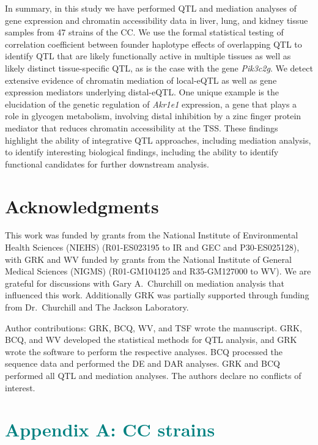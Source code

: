 \documentclass[9pt,twocolumn,twoside]{gsajnl}
\newcommand{\GKinline}[1]{\textcolor{teal}{#1}}
\begin{document}
In summary, in this study we have performed QTL and mediation analyses of gene expression and chromatin accessibility data in liver, lung, and kidney tissue samples from 47 strains of the CC. We use the formal statistical testing of correlation coefficient between founder haplotype effects of overlapping QTL to identify QTL that are likely functionally active in multiple tissues as well as likely distinct tissue-specific QTL, as is the case with the gene \textit{Pik3c2g}. We detect extensive evidence of chromatin mediation of local-eQTL as well as gene expression mediators underlying distal-eQTL. One unique example is the elucidation of the genetic regulation of \textit{Akr1e1} expression, a gene that plays a role in glycogen metabolism, involving distal inhibition by a zinc finger protein mediator that reduces chromatin accessibility at the TSS. These findings highlight the ability of integrative QTL approaches, including mediation analysis, to identify interesting biological findings, including the ability to identify functional candidates for further downstream analysis.

\section{Acknowledgments}
This work was funded by grants from the National Institute of Environmental Health Sciences (NIEHS) (R01-ES023195 to IR and GEC and P30-ES025128), with GRK and WV funded by grants from the National Institute of General Medical Sciences (NIGMS) (R01-GM104125 and R35-GM127000 to WV). We are grateful for discussions with Gary A.\ Churchill on mediation analysis that influenced this work. Additionally GRK was partially supported through funding from Dr.\ Churchill and The Jackson Laboratory.

Author contributions: GRK, BCQ, WV, and TSF wrote the manuscript. GRK, BCQ, and WV developed the statistical methods for QTL analysis, and GRK wrote the software to perform the respective analyses. BCQ processed the sequence data and performed the DE and DAR analyses. GRK and BCQ performed all QTL and mediation analyses. The authors declare no conflicts of interest.



\clearpage

\section{\GKinline{Appendix A: CC strains}}
\end{document}
